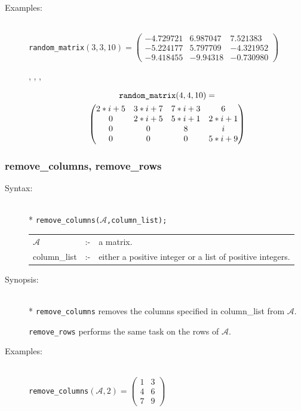 {\begin{description}
\item[Examples:]\mbox{}\\
  \texttt{random\_matrix}\((3,3,10) =
  \begin{pmatrix} -4.729721 & 6.987047 & 7.521383 \\
    - 5.224177 & 5.797709 & - 4.321952 \\
    - 9.418455 & - 9.94318 & - 0.730980
  \end{pmatrix}\)

  , , , 

  \begin{multline*}
  \text{\texttt{random\_matrix}}(4,4,10) = \\
  \begin{pmatrix} 2*i+5 & 3*i+7 & 7*i+3 & 6 \\ 0 & 2*i+5 &
    5*i+1 & 2*i+1 \\ 0 & 0 & 8 & i \\ 0 & 0 & 0& 5*i+9
  \end{pmatrix}
\end{multline*}
\end{description}


\subsubsection{remove\_columns, remove\_rows}
\label{linalg:remove_columns}
\hypertarget{operator:REMOVE_COLUMNS}{}

\begin{description}
\item[Syntax:]\mbox{}\\*
{\tt remove\_columns($\mathcal{A}$,column\_list);}\\[2mm]
\begin{tabular}{l l l}
$\mathcal{A}$   &:-& a matrix. \\
column\_list &:-& either a positive integer or a list of
                  positive integers.
\end{tabular}

\item[Synopsis:]\mbox{}\\*
\texttt{remove\_columns} removes the columns specified in
                column\_list from $\mathcal{A}$.

\texttt{remove\_rows} performs the same task on the rows
                of $\mathcal{A}$.

\item[Examples:]\mbox{}\\
\texttt{remove\_columns}\((\mathcal{A},2) =
        \begin{pmatrix} 1 & 3 \\ 4 & 6 \\ 7 & 9  \end{pmatrix}\)


\end{description}}
